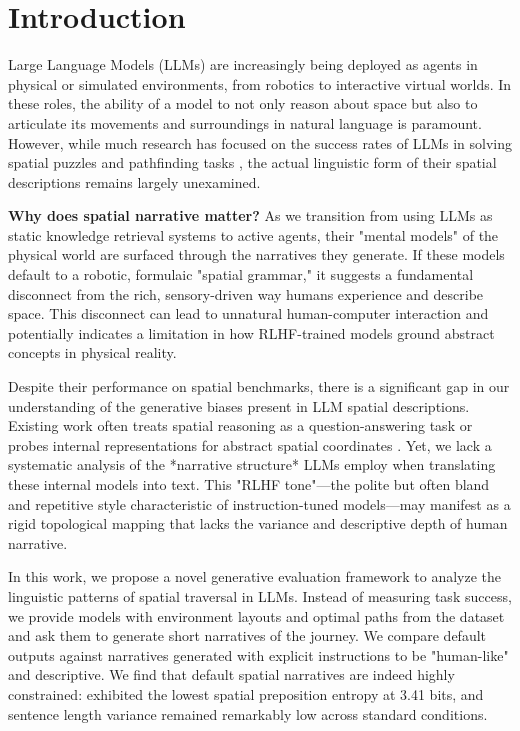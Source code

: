 \section{Introduction}
\label{sec:intro}

Large Language Models (LLMs) are increasingly being deployed as agents in physical or simulated environments, from robotics to interactive virtual worlds. In these roles, the ability of a model to not only reason about space but also to articulate its movements and surroundings in natural language is paramount. However, while much research has focused on the success rates of LLMs in solving spatial puzzles and pathfinding tasks \cite{shi2022stepgame, li2024advancing}, the actual linguistic form of their spatial descriptions remains largely unexamined.

{\bf Why does spatial narrative matter?} As we transition from using LLMs as static knowledge retrieval systems to active agents, their "mental models" of the physical world are surfaced through the narratives they generate. If these models default to a robotic, formulaic "spatial grammar," it suggests a fundamental disconnect from the rich, sensory-driven way humans experience and describe space. This disconnect can lead to unnatural human-computer interaction and potentially indicates a limitation in how RLHF-trained models ground abstract concepts in physical reality.

Despite their performance on spatial benchmarks, there is a significant gap in our understanding of the generative biases present in LLM spatial descriptions. Existing work often treats spatial reasoning as a question-answering task \cite{weston2015towards} or probes internal representations for abstract spatial coordinates \cite{martorell2025text}. Yet, we lack a systematic analysis of the *narrative structure* LLMs employ when translating these internal models into text. This "RLHF tone"---the polite but often bland and repetitive style characteristic of instruction-tuned models---may manifest as a rigid topological mapping that lacks the variance and descriptive depth of human narrative.

In this work, we propose a novel generative evaluation framework to analyze the linguistic patterns of spatial traversal in LLMs. Instead of measuring task success, we provide models with environment layouts and optimal paths from the \babitask dataset and ask them to generate short narratives of the journey. We compare default outputs against narratives generated with explicit instructions to be "human-like" and descriptive. We find that default spatial narratives are indeed highly constrained: \gpto exhibited the lowest spatial preposition entropy at 3.41 bits, and sentence length variance remained remarkably low across standard conditions.

